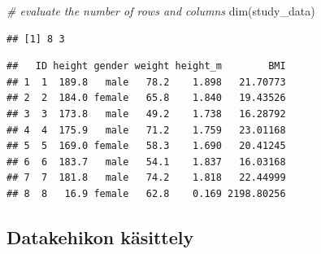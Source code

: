 \documentclass[
]{book}
\newenvironment{Shaded}{\begin{snugshade}}{\end{snugshade}}
\newcommand{\CommentTok}[1]{\textcolor[rgb]{0.56,0.35,0.01}{\textit{#1}}}
\newcommand{\DecValTok}[1]{\textcolor[rgb]{0.00,0.00,0.81}{#1}}
\newcommand{\FloatTok}[1]{\textcolor[rgb]{0.00,0.00,0.81}{#1}}
\newcommand{\FunctionTok}[1]{\textcolor[rgb]{0.00,0.00,0.00}{#1}}
\newcommand{\NormalTok}[1]{#1}
\newcommand{\OtherTok}[1]{\textcolor[rgb]{0.56,0.35,0.01}{#1}}
\newcommand{\SpecialCharTok}[1]{\textcolor[rgb]{0.00,0.00,0.00}{#1}}
\begin{document}
\begin{Shaded}
\begin{Highlighting}[]
\CommentTok{\# evaluate the number of rows and columns}
\FunctionTok{dim}\NormalTok{(study\_data)}
\end{Highlighting}
\end{Shaded}

\begin{verbatim}
## [1] 8 3
\end{verbatim}

\begin{Shaded}
\end{Shaded}

\begin{verbatim}
##   ID height gender weight height_m        BMI
## 1  1  189.8   male   78.2    1.898   21.70773
## 2  2  184.0 female   65.8    1.840   19.43526
## 3  3  173.8   male   49.2    1.738   16.28792
## 4  4  175.9   male   71.2    1.759   23.01168
## 5  5  169.0 female   58.3    1.690   20.41245
## 6  6  183.7   male   54.1    1.837   16.03168
## 7  7  181.8   male   74.2    1.818   22.44999
## 8  8   16.9 female   62.8    0.169 2198.80256
\end{verbatim}

\hypertarget{datakehikon-kuxe4sittely}{%
\subsection{Datakehikon käsittely}\label{datakehikon-kuxe4sittely}}
\end{document}
